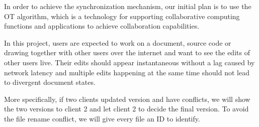 \noindent In order to achieve the synchronization mechanism, our initial plan is to use the OT algorithm, which is a technology for supporting collaborative computing functions and applications to achieve collaboration capabilities.

\vspace{0.3cm}

\noindent In this project, users are expected to work on a document, source code or drawing together with other users over the internet and want to see the edits of other users live. Their edits should appear instantaneous without a lag caused by network latency and multiple edits happening at the same time should not lead to divergent document states. 

\vspace{0.3cm}

\noindent More specifically, if two clients updated version and have conflicts, we will show the two versions to client 2 and let client 2 to decide the final version. To avoid the file rename conflict, we will give every file an ID to identify.




